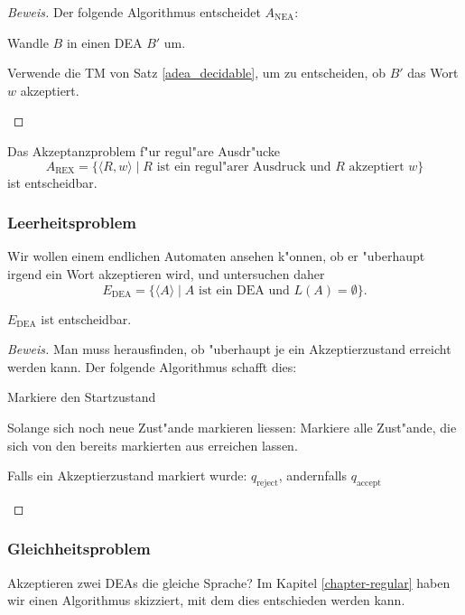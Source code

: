\begin{proof}[Beweis]
Der folgende Algorithmus entscheidet 
$A_{\text{NEA}}$:
\medskip
\begin{compactenum}
\item Wandle $B$ in einen DEA $B'$ um.
\item Verwende die TM von Satz \ref{adea_decidable}, um zu
entscheiden, ob $B'$ das Wort $w$ akzeptiert.
\end{compactenum}
\medskip
\end{proof}

\begin{satz} Das Akzeptanzproblem f"ur regul"are Ausdr"ucke
%
\[
A_{\text{REX}}=\{
\langle R,w\rangle\;|\;\text{$R$ ist ein regul"arer Ausdruck und $R$ akzeptiert $w$}
\}
\]
%
ist entscheidbar.
\end{satz}

\subsubsection{Leerheitsproblem}
%
Wir wollen einem endlichen Automaten ansehen k"onnen, ob er "uberhaupt
irgend ein Wort akzeptieren wird, und untersuchen daher
\[
E_{\text{DEA}}
=\{
\langle A\rangle \;|\;\text{$A$  ist ein DEA und $L(A)=\emptyset$}
\}.
\]
\begin{satz}
$E_{\text{DEA}}$
%
ist entscheidbar.
\end{satz}

\begin{proof}[Beweis]
Man muss herausfinden, ob "uberhaupt je ein Akzeptierzustand erreicht
werden kann.
Der folgende Algorithmus schafft dies:
\medskip
\begin{compactenum}
\item Markiere den Startzustand
\item Solange sich noch neue Zust"ande markieren liessen:
 Markiere alle Zust"ande, die sich von den bereits markierten aus
erreichen lassen.
\item Falls ein Akzeptierzustand markiert wurde: $q_{\text{reject}}$,
andernfalls
$q_{\text{accept}}$
\end{compactenum}
\medskip
\end{proof}

\subsubsection{Gleichheitsproblem}
%
Akzeptieren zwei DEAs die gleiche Sprache? Im Kapitel \ref{chapter-regular}
haben wir einen Algorithmus skizziert, mit dem dies entschieden werden kann.

